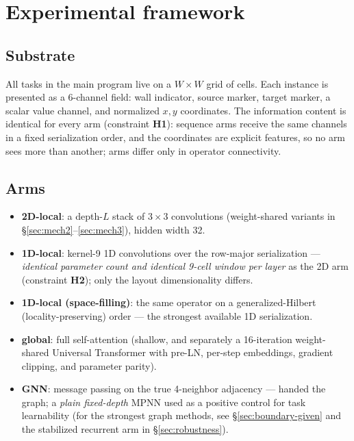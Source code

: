\documentclass[11pt]{article}
\begin{document}
\section{Experimental framework}\label{sec:framework}

\subsection{Substrate}\label{sec:substrate}

All tasks in the main program live on a $W \times W$ grid of cells. Each instance is
presented as a 6-channel field: wall indicator, source marker, target marker,
a scalar value channel, and normalized $x, y$ coordinates. The information
content is identical for every arm (constraint \textbf{H1}): sequence arms
receive the same channels in a fixed serialization order, and the coordinates
are explicit features, so no arm sees more than another; arms differ only in
operator connectivity.

\subsection{Arms}\label{sec:arms}

\begin{itemize}
\item \textbf{2D-local}: a depth-$L$ stack of $3\times3$ convolutions
  (weight-shared variants in \S\ref{sec:mech2}--\ref{sec:mech3}), hidden width
  32.
\item \textbf{1D-local}: kernel-9 1D convolutions over the row-major
  serialization --- \emph{identical parameter count and identical 9-cell
  window per layer} as the 2D arm (constraint \textbf{H2}); only the layout
  dimensionality differs.
\item \textbf{1D-local (space-filling)}: the same operator on a
  generalized-Hilbert (locality-preserving) order --- the strongest available
  1D serialization.
\item \textbf{global}: full self-attention (shallow, and separately a
  16-iteration weight-shared Universal Transformer with pre-LN, per-step
  embeddings, gradient clipping, and parameter parity).
\item \textbf{GNN}: message passing on the true 4-neighbor adjacency ---
  handed the graph; a \emph{plain fixed-depth} MPNN used as a positive
  control for task learnability (for the strongest graph methods, see
  \S\ref{sec:boundary-given} and the stabilized recurrent arm in
  \S\ref{sec:robustness}).
\end{itemize}
\end{document}
